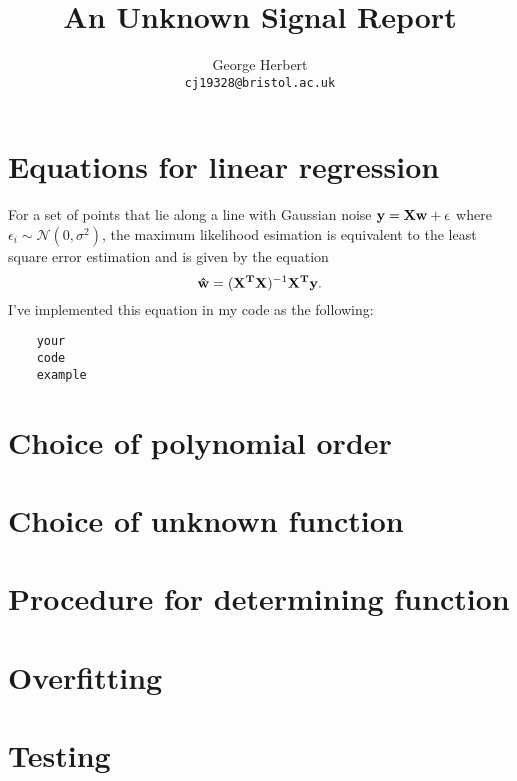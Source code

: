 \documentclass[onecolumn, 12pt, a4paper]{article}
\author{
  George Herbert\\
  \texttt{cj19328@bristol.ac.uk}
}
\title{An Unknown Signal Report}
\begin{document}
\maketitle

\section{Equations for linear regression}

For a set of points that lie along a line with Gaussian noise 
$\vb{y} = \vb{X}\vb{w} + \vb{\epsilon}$ where $\epsilon_{i} \sim \mathcal{N}(0, \sigma^{2})$,
the maximum likelihood esimation is equivalent to the least square 
error estimation and is given by the equation
\[
    \vb{\hat{w}} = (\vb{X^{T}}\vb{X})^{-1}\vb{X^{T}}\vb{y}.
\]
I've implemented this equation in my code as the following:

\begin{verbatim}
    your
    code
    example
\end{verbatim}


\section{Choice of polynomial order}

\section{Choice of unknown function}

\section{Procedure for determining function}

\section{Overfitting}

\section{Testing}
\end{document}
